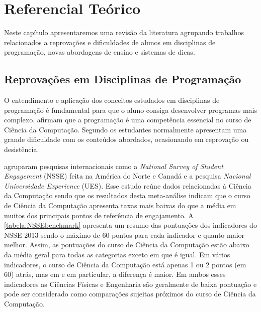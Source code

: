 \chapter{Referencial Teórico}
Neste capítulo apresentaremos uma revisão da literatura agrupando trabalhos relacionados a reprovações e dificuldades de alunos em disciplinas de programação, novas abordagens de ensino e sistemas de dicas. 

\section{Reprovações em Disciplinas de Programação}

O entendimento e aplicação dos conceitos estudados em disciplinas de programação é fundamental para que o aluno consiga desenvolver programas mais complexo.  afirmam que a programação é uma competência essencial no curso de Ciência da Computação. Segundo  os estudantes normalmente apresentam uma grande dificuldade com os conteúdos abordados, ocasionando em reprovação ou desistência.

 agruparam pesquisas internacionais como a \textit{National Survey of Student Engagement} (NSSE) feita na América do Norte e Canadá e a pesquisa \textit{Nacional Universidade Experience} (UES). Esse estudo reúne dados relacionadas à Ciência da Computação sendo que os resultados desta meta-análise indicam que o curso de Ciência da Computação apresenta taxas mais baixas do que a média em muitos dos principais pontos de referência de engajamento. A \cref{tabela:NSSEbenchmark} apresenta um resumo das pontuações dos indicadores do NSSE 2013 sendo o máximo de 60 pontos para cada indicador e quanto maior melhor. Assim, as pontuações do curso de Ciência da Computação estão abaixo da média geral para todas as categorias exceto  em que é igual. Em vários indicadores, o curso de Ciência da Computação está apenas 1 ou 2 pontos (em 60) atrás, mas em  e  em particular, a diferença é maior. Em ambos esses indicadores as Ciências Físicas e Engenharia são geralmente de baixa pontuação e pode ser considerado como comparações sujeitas próximos do curso de Ciência da Computação. 

